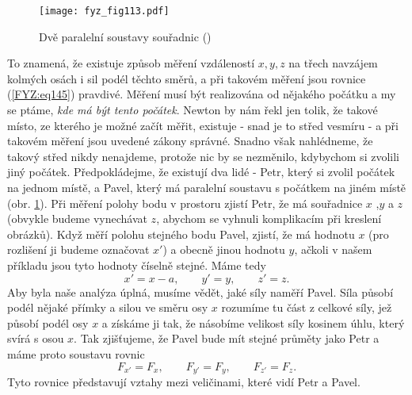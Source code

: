     \begin{figure}[ht!]  %
      \centering
      \texttt{[image: fyz\_fig113.pdf]}
      \caption{Dvě paralelní soustavy souřadnic
              (\cite[s.~154]{Feynman01})}
      \label{fyz:fig113}
    \end{figure}
    To znamená, že existuje způsob měření vzdáleností \(x, y, z\) na třech navzájem kolmých osách i 
    sil podél těchto směrů, a při takovém měření jsou rovnice (\ref{FYZ:eq145}) pravdivé. Měření 
    musí být realizována od nějakého počátku a my se ptáme, \emph{kde má být tento počátek}. Newton 
    by nám řekl jen tolik, že takové místo, ze kterého je možné začít měřit, existuje - snad je to 
    střed vesmíru - a při takovém měření jsou uvedené zákony správné. Snadno však nahlédneme, že 
    takový střed nikdy nenajdeme, protože nic by se nezměnilo, kdybychom si zvolili jiný počátek. 
    Předpokládejme, že existují dva lidé - Petr, který si zvolil počátek na jednom místě, a Pavel, 
    který má paralelní soustavu s počátkem na jiném místě (obr. \ref{fyz:fig113}). Při měření 
    polohy bodu v prostoru zjistí Petr, že má souřadnice \(x\) ,\(y\) a \(z\) (obvykle budeme 
    vynechávat \(z\), abychom se vyhnuli komplikacím při kreslení obrázků). Když měří polohu 
    stejného bodu Pavel, zjistí, že má hodnotu \(x\) (pro rozlišení ji budeme označovat \(x'\)) a 
    obecně jinou hodnotu \(y\), ačkoli v našem příkladu jsou tyto hodnoty číselně stejné. Máme tedy
    \begin{equation}\label{FYZ:eq146}
      x' = x - a, \qquad y' = y, \qquad z' = z.
    \end{equation}
    Aby byla naše analýza úplná, musíme vědět, jaké síly naměří Pavel. Síla působí podél nějaké 
    přímky a silou ve směru osy \(x\) rozumíme tu část z celkové síly, jež působí podél osy \(x\) a 
    získáme ji tak, že násobíme velikost síly kosinem úhlu, který svírá s osou \(x\). Tak 
    zjišťujeme, že Pavel bude mít stejné průměty jako Petr a máme proto soustavu rovnic
    \begin{equation}\label{FYZ:eq147}
      F_{x'} = F_x, \qquad F_{y'} = F_y, \qquad F_{z'} = F_z.
    \end{equation}
    Tyto rovnice představují vztahy mezi veličinami, které vidí Petr a Pavel.
    
